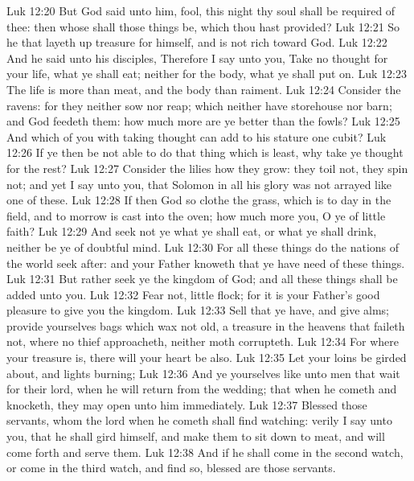 \vs Luk 12:20 But God said unto him,  fool, this night thy soul shall be required of thee: then whose shall those things be, which thou hast provided?
\vs Luk 12:21 So  he that layeth up treasure for himself, and is not rich toward God.
\vs Luk 12:22 And he said unto his disciples, Therefore I say unto you, Take no thought for your life, what ye shall eat; neither for the body, what ye shall put on.
\vs Luk 12:23 The life is more than meat, and the body  than raiment.
\vs Luk 12:24 Consider the ravens: for they neither sow nor reap; which neither have storehouse nor barn; and God feedeth them: how much more are ye better than the fowls?
\vs Luk 12:25 And which of you with taking thought can add to his stature one cubit?
\vs Luk 12:26 If ye then be not able to do that thing which is least, why take ye thought for the rest?
\vs Luk 12:27 Consider the lilies how they grow: they toil not, they spin not; and yet I say unto you, that Solomon in all his glory was not arrayed like one of these.
\vs Luk 12:28 If then God so clothe the grass, which is to day in the field, and to morrow is cast into the oven; how much more  you, O ye of little faith?
\vs Luk 12:29 And seek not ye what ye shall eat, or what ye shall drink, neither be ye of doubtful mind.
\vs Luk 12:30 For all these things do the nations of the world seek after: and your Father knoweth that ye have need of these things.
\vs Luk 12:31 But rather seek ye the kingdom of God; and all these things shall be added unto you.
\vs Luk 12:32 Fear not, little flock; for it is your Father's good pleasure to give you the kingdom.
\vs Luk 12:33 Sell that ye have, and give alms; provide yourselves bags which wax not old, a treasure in the heavens that faileth not, where no thief approacheth, neither moth corrupteth.
\vs Luk 12:34 For where your treasure is, there will your heart be also.
\vs Luk 12:35 Let your loins be girded about, and  lights burning;
\vs Luk 12:36 And ye yourselves like unto men that wait for their lord, when he will return from the wedding; that when he cometh and knocketh, they may open unto him immediately.
\vs Luk 12:37 Blessed  those servants, whom the lord when he cometh shall find watching: verily I say unto you, that he shall gird himself, and make them to sit down to meat, and will come forth and serve them.
\vs Luk 12:38 And if he shall come in the second watch, or come in the third watch, and find  so, blessed are those servants.
